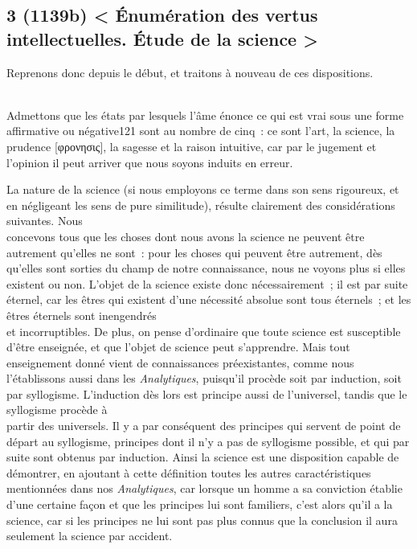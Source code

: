 \documentclass[french,twoside]{book} %
\begin{document}
\subsection[{3 (1139b) < Énumération des vertus intellectuelles. Étude de la science >}]{3 (1139b) < Énumération des vertus intellectuelles. Étude de la science >}
\noindent Reprenons donc depuis le début, et traitons à nouveau de ces dispositions.\par
\\
Admettons que les états par lesquels l’âme énonce ce qui est vrai sous une forme affirmative ou négative121 sont au nombre de cinq : ce sont l’art, la science, la prudence [φρονησις], la sagesse et la raison intuitive, car par le jugement et l’opinion il peut arriver que nous soyons induits en erreur.\par
La nature de la science (si nous employons ce terme dans son sens rigoureux, et en négligeant les sens de pure similitude), résulte clairement des considérations suivantes. Nous \\
concevons tous que les choses dont nous avons la science ne peuvent être autrement qu’elles ne sont : pour les choses qui peuvent être autrement, dès qu’elles sont sorties du champ de notre connaissance, nous ne voyons plus si elles existent ou non. L’objet de la science existe donc nécessairement ; il est par suite éternel, car les êtres qui existent d’une nécessité absolue sont tous éternels ; et les êtres éternels sont inengendrés \\
et incorruptibles. De plus, on pense d’ordinaire que toute science est susceptible d’être enseignée, et que l’objet de science peut s’apprendre. Mais tout enseignement donné vient de connaissances préexistantes, comme nous l’établissons aussi dans les {\itshape Analytiques}, puisqu’il procède soit par induction, soit par syllogisme. L’induction dès lors est principe aussi de l’universel, tandis que le syllogisme procède à \\
partir des universels. Il y a par conséquent des principes qui servent de point de départ au syllogisme, principes dont il n’y a pas de syllogisme possible, et qui par suite sont obtenus par induction. Ainsi la science est une disposition capable de démontrer, en ajoutant à cette définition toutes les autres caractéristiques mentionnées dans nos {\itshape Analytiques}, car lorsque un homme a sa conviction établie d’une certaine façon et que les principes lui sont familiers, c’est alors qu’il a la science, car si les principes ne lui sont pas plus connus que la conclusion il aura seulement la science par accident.
\end{document}
